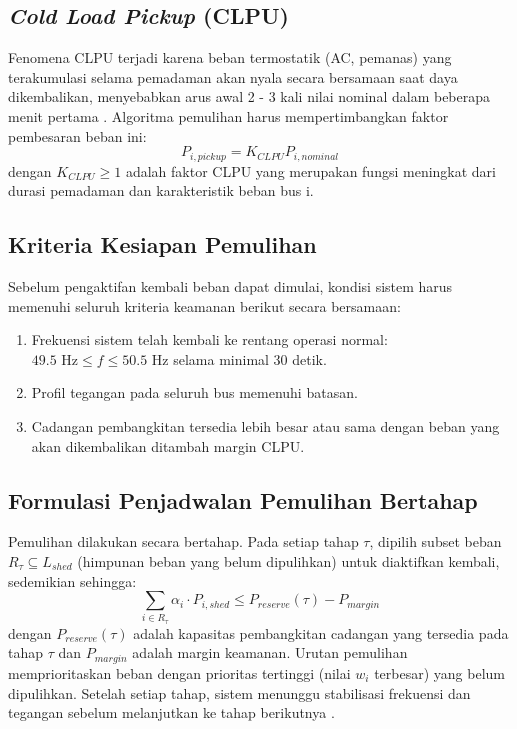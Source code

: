 \subsection{\textit{Cold Load Pickup} (CLPU)}
\label{subsec:Cold_Load_Pickup}

Fenomena CLPU terjadi karena beban termostatik (AC, pemanas) yang terakumulasi selama pemadaman akan nyala secara bersamaan saat daya dikembalikan, menyebabkan arus awal 2 - 3 kali nilai nominal dalam beberapa menit pertama \cite{Adibi2000}. Algoritma pemulihan harus mempertimbangkan faktor pembesaran beban ini:
\begin{equation}
    P_{i,pickup} = K_{CLPU} P_{i, nominal}
\end{equation}
dengan $K_{CLPU}\ge1$ adalah faktor CLPU yang merupakan fungsi meningkat dari durasi pemadaman dan karakteristik beban bus i.

\subsection{Kriteria Kesiapan Pemulihan}
\label{subsec:Kriteria_Kesiapan_Pemulihan}

Sebelum pengaktifan kembali beban dapat dimulai, kondisi sistem harus memenuhi seluruh kriteria keamanan berikut secara bersamaan:

\begin{enumerate}
    \item[a.] Frekuensi sistem telah kembali ke rentang operasi normal: $49.5 \text{ Hz} \le f \le 50.5 \text{ Hz}$ selama minimal 30 detik.
    \item[b.] Profil tegangan pada seluruh bus memenuhi batasan.
    \item[c.] Cadangan pembangkitan tersedia lebih besar atau sama dengan beban yang akan dikembalikan ditambah margin CLPU.
\end{enumerate}

\subsection{Formulasi Penjadwalan Pemulihan Bertahap}
\label{subsec:Formulasi_Penjadwalan_Pemulihan_Bertahap}

Pemulihan dilakukan secara bertahap. Pada setiap tahap $\tau$, dipilih subset beban $R_{\tau}\subseteq L_{shed}$ (himpunan beban yang belum dipulihkan) untuk diaktifkan kembali, sedemikian sehingga:
\begin{equation}
    \sum_{i\in R_{\tau}}\alpha_{i}\cdot P_{i,shed}\le P_{reserve}(\tau)-P_{margin}
\end{equation}
dengan $P_{reserve}(\tau)$ adalah kapasitas pembangkitan cadangan yang tersedia pada tahap $\tau$ dan $P_{margin}$ adalah margin keamanan. Urutan pemulihan memprioritaskan beban dengan prioritas tertinggi (nilai $w_{i}$ terbesar) yang belum dipulihkan. Setelah setiap tahap, sistem menunggu stabilisasi frekuensi dan tegangan sebelum melanjutkan ke tahap berikutnya \cite{Adibi2000}.

